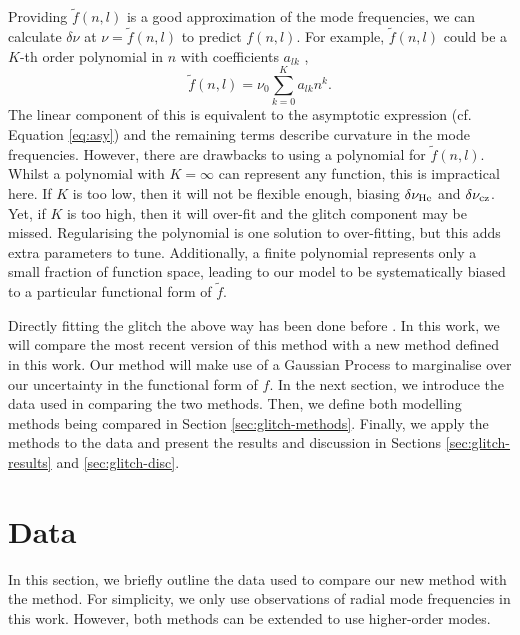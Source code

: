 Providing \(\tilde{f}(n, l)\) is a good approximation of the mode frequencies, we can calculate \(\delta\nu\) at \(\nu = \tilde{f}(n, l)\) to predict \(f(n, l)\). For example, \(\tilde{f}(n,l)\) could be a \(K\)-th order polynomial in \(n\) with coefficients \(a_{lk}\) \citep[e.g.][]{Kjeldsen.Bedding.ea2005,Ulrich1986},
%
\begin{equation}
    \tilde{f}(n, l) = \nu_0 \sum_{k=0}^{K} a_{lk} n^k. \label{eq:poly}
\end{equation}
%
The linear component of this is equivalent to the asymptotic expression (cf. Equation \ref{eq:asy}) and the remaining terms describe curvature in the mode frequencies. However, there are drawbacks to using a polynomial for \(\tilde{f}(n, l)\). Whilst a polynomial with \(K = \infty\) can represent any function, this is impractical here. If \(K\) is too low, then it will not be flexible enough, biasing \(\delta\nu_{{\mathrm{He}}}\) and \(\delta\nu_{{\mathrm{cz}}}\). Yet, if \(K\) is too high, then it will over-fit and the glitch component may be missed. Regularising the polynomial is one solution to over-fitting, but this adds extra parameters to tune. Additionally, a finite polynomial represents only a small fraction of function space, leading to our model to be systematically biased to a particular functional form of \(\tilde{f}\).


Directly fitting the glitch the above way has been done before \citep[e.g.][]{Verma.Faria.ea2014,Verma.Raodeo.ea2017,Mazumdar.Monteiro.ea2014}. In this work, we will compare the most recent version of this method \citep[][hereafter V19]{Verma.Raodeo.ea2019} with a new method defined in this work. Our method will make use of a Gaussian Process to marginalise over our uncertainty in the functional form of \(f\). In the next section, we introduce the data used in comparing the two methods. Then, we define both modelling methods being compared in Section \ref{sec:glitch-methods}. Finally, we apply the methods to the data and present the results and discussion in Sections \ref{sec:glitch-results} and \ref{sec:glitch-disc}.

\section{Data}\label{sec:glitch-data}

In this section, we briefly outline the data used to compare our new method with the  method. For simplicity, we only use observations of radial mode frequencies in this work. However, both methods can be extended to use higher-order modes.

